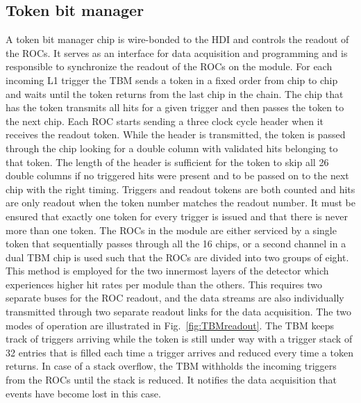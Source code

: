 \subsection{Token bit manager}

A token bit manager chip is wire-bonded to the HDI and controls the readout of the ROCs.
It serves as an interface for data acquisition and programming and is responsible to synchronize the readout of the ROCs on the module.
For each incoming L1 trigger the TBM sends a token in a fixed order from chip to chip and waits until the token returns from the last chip in the chain.
The chip that has the token transmits all hits for a given trigger and then passes the token to the next chip.
Each ROC starts sending a three clock cycle header when it receives the readout token.
While the header is transmitted, the token is passed through the chip looking for a double column with validated hits belonging to that token.
The length of the header is sufficient for the token to skip all 26 double columns if no triggered hits were present and to be passed on to the next chip with the right timing.
Triggers and readout tokens are both counted and hits are only readout when the token number matches the readout number.
It must be ensured that exactly one token for every trigger is issued and that there is never more than one token.
The ROCs in the module are either serviced by a single token that sequentially passes through all the 16 chips, or a second channel in a dual TBM chip is used such that the ROCs are divided into two groups of eight.
This method is employed for the two innermost layers of the detector which experiences higher hit rates per module than the others.
This requires two separate buses for the ROC readout, and the data streams are also individually transmitted through two separate readout links for the data acquisition. 
The two modes of operation are illustrated in Fig.~\ref{fig:TBMreadout}.
The TBM keeps track of triggers arriving while the token is still under way with a trigger stack of 32 entries that is filled each time a trigger arrives and reduced every time a token returns.
In case of a stack overflow, the TBM withholds the incoming triggers from the ROCs until the stack is reduced. It notifies the data acquisition that events have become lost in this case.
